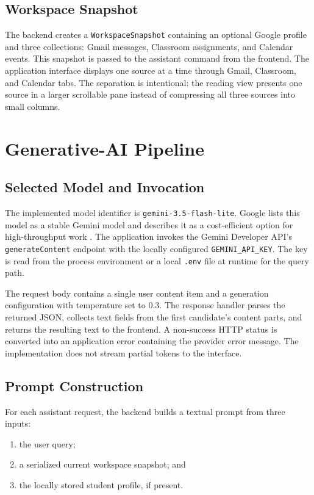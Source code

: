 \documentclass[conference]{IEEEtran}
\begin{document}
\subsection{Workspace Snapshot}

The backend creates a \texttt{WorkspaceSnapshot} containing an optional Google profile and three collections: Gmail messages, Classroom assignments, and Calendar events. This snapshot is passed to the assistant command from the frontend. The application interface displays one source at a time through Gmail, Classroom, and Calendar tabs. The separation is intentional: the reading view presents one source in a larger scrollable pane instead of compressing all three sources into small columns.

\section{Generative-AI Pipeline}

\subsection{Selected Model and Invocation}

The implemented model identifier is \texttt{gemini-3.5-flash-lite}. Google lists this model as a stable Gemini model and describes it as a cost-efficient option for high-throughput work \cite{gemini_models,gemini_lite}. The application invokes the Gemini Developer API's \texttt{generateContent} endpoint with the locally configured \texttt{GEMINI\_API\_KEY}. The key is read from the process environment or a local \texttt{.env} file at runtime for the query path.

The request body contains a single user content item and a generation configuration with temperature set to 0.3. The response handler parses the returned JSON, collects text fields from the first candidate's content parts, and returns the resulting text to the frontend. A non-success HTTP status is converted into an application error containing the provider error message. The implementation does not stream partial tokens to the interface.

\subsection{Prompt Construction}

For each assistant request, the backend builds a textual prompt from three inputs:

\begin{enumerate}
    \item the user query;
    \item a serialized current workspace snapshot; and
    \item the locally stored student profile, if present.
\end{enumerate}
\end{document}
